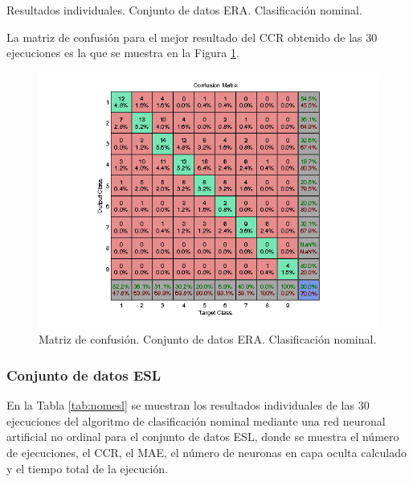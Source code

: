 			\begin{table}[!htbp]
				\centering
				\caption{Resultados individuales. Conjunto de datos ERA. Clasificación nominal.}
				\label{tab:nomera}
			\end{table}
			
			La matriz de confusión para el mejor resultado del CCR obtenido de las 30 ejecuciones es la que se muestra en la Figura \ref{fig:nomera}.
			
			\begin{figure}[htbp]
				\centering
				\includegraphics[scale=0.8]{../src/results/nominal/ERA_mc2.png}
				\caption{Matriz de confusión. Conjunto de datos ERA. Clasificación nominal.}
				\label{fig:nomera}
			\end{figure}

			\subsubsection{Conjunto de datos ESL}
			
			En la Tabla \ref{tab:nomesl} se muestran los resultados individuales de las 30 ejecuciones del algoritmo de clasificación nominal mediante una red neuronal artificial no ordinal para el conjunto de datos ESL, donde se muestra el número de ejecuciones, el CCR, el MAE, el número de neuronas en capa oculta calculado y el tiempo total de la ejecución.\\
			
